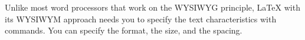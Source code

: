 Unlike most word processors that work on the \gls{WYSIWYG} principle, \LaTeX{} with its \gls{WYSIWYM} approach needs you to specify the text characteristics with \glspl{command}. You can specify the format, the size, and the spacing.